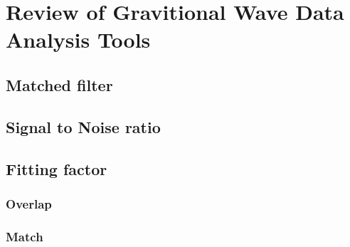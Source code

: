 
\chapter{Review of Gravitional Wave Data Analysis Tools}
\section{Matched filter}
\section{Signal to Noise ratio}
\section{Fitting factor}
\subsection{Overlap}
\subsection{Match}


